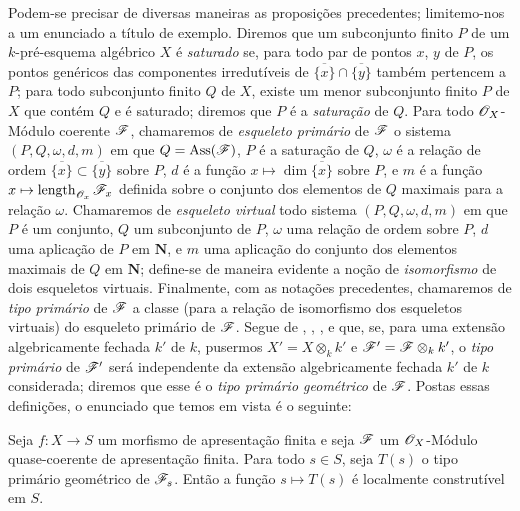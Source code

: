\begin{remark}[9.8.9]
\label{IV.9.8.9}
Podem-se precisar de diversas maneiras as proposições precedentes; limitemo-nos a um enunciado a título de exemplo.
Diremos que um subconjunto finito $P$ de um $k$-pré-esquema algébrico $X$ é \emph{saturado} se, para todo par de pontos $x$, $y$ de $P$, os pontos genéricos das componentes irredutíveis de $\overline{\{x\}}\cap\overline{\{y\}}$ também pertencem a $P$; para todo subconjunto finito $Q$ de $X$, existe um menor subconjunto finito $P$ de $X$ que contém $Q$ e é saturado; diremos que $P$ é a \emph{saturação} de $Q$.
Para todo $\mathscr{O}_X$-Módulo coerente $\mathscr{F}$, chamaremos de \emph{esqueleto primário} de $\mathscr{F}$ o sistema $(P,Q,\omega,d,m)$ em que $Q=\operatorname{Ass}(\mathscr{F})$, $P$ é a saturação de $Q$, $\omega$ é a relação de ordem $\overline{\{x\}}\subset\overline{\{y\}}$ sobre $P$, $d$ é a função $x\mapsto\dim\overline{\{x\}}$ sobre $P$, e $m$ é a função $x\mapsto\operatorname{length}_{\sh{O}_x}\sh{F}_x$ definida sobre o conjunto dos elementos de $Q$ maximais para a relação $\omega$.
Chamaremos de \emph{esqueleto virtual} todo sistema $(P,Q,\omega,d,m)$ em que $P$ é um conjunto, $Q$ um subconjunto de $P$, $\omega$ uma relação de ordem sobre $P$, $d$ uma aplicação de $P$ em $\mathbf{N}$, e $m$ uma aplicação do conjunto dos elementos maximais de $Q$ em $\mathbf{N}$; define-se de maneira evidente a noção de \emph{isomorfismo} de dois esqueletos virtuais.
Finalmente, com as notações precedentes, chamaremos de \emph{tipo primário} de $\mathscr{F}$ a classe (para a relação de isomorfismo dos esqueletos virtuais) do esqueleto primário de $\mathscr{F}$.
Segue de , , ,  e  que, se, para uma extensão algebricamente fechada $k'$ de $k$, pusermos $X'=X\otimes_k k'$ e $\mathscr{F}'=\mathscr{F}\otimes_k k'$, o \emph{tipo primário} de $\mathscr{F}'$ será independente da
extensão algebricamente fechada $k'$ de $k$ considerada; diremos que esse é o \emph{tipo primário geométrico} de $\mathscr{F}$.
Postas essas definições, o enunciado que temos em vista é o seguinte:

\medskip
\noindent
\emph{}
\label{IV.9.8.9.1}
Seja $f:X\to S$ um morfismo de apresentação finita e seja $\mathscr{F}$ um $\mathscr{O}_X$-Módulo quase-coerente de apresentação finita.
Para todo $s\in S$, seja $T(s)$ o tipo primário geométrico de $\mathscr{F}_s$.
Então a função $s\mapsto T(s)$ é localmente construtível em $S$.


\end{remark}
